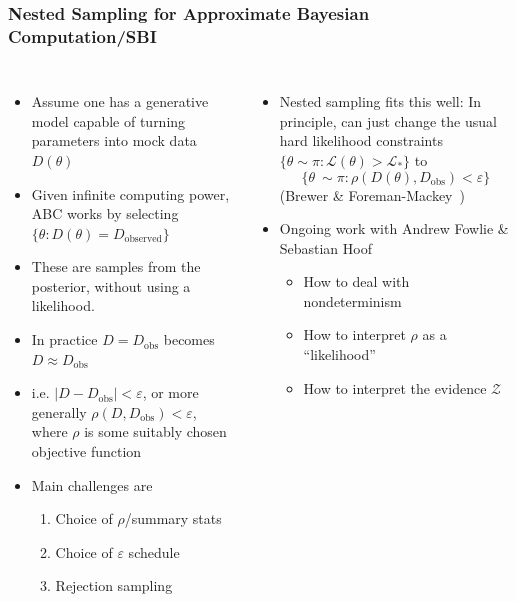 \documentclass[aspectratio=169]{beamer}
\begin{document}
\begin{frame}
    \frametitle{Nested Sampling for Approximate Bayesian Computation/SBI}
    \begin{columns}
        \begin{itemize}
            \item Assume one has a generative model capable of turning parameters into mock data $D(\theta)$
            \item Given infinite computing power, ABC works by selecting $\{\theta : D(\theta)=D_\mathrm{observed}\}$
            \item These are samples from the posterior, without using a likelihood.
            \item In practice $D=D_\mathrm{obs}$ becomes $D\approx D_\mathrm{obs}$
            \item i.e. $|D-D_\mathrm{obs}|<\varepsilon$, or more generally $\boxed{\rho(D,D_\mathrm{obs})<\varepsilon}$, where $\rho$ is some suitably chosen objective function
            \item Main challenges are 
                \begin{enumerate}
                    \item Choice of $\rho$/summary stats
                    \item Choice of $\varepsilon$ schedule
                    \item Rejection sampling
                \end{enumerate}
        \end{itemize}
        \begin{itemize}
            \item Nested sampling fits this well: In principle, can just change the usual hard likelihood constraints $\{\theta\sim\pi : \mathcal{L}(\theta)>\mathcal{L}_*\}$ to
                \[\{\theta~\sim\pi : \rho(D(\theta),D_\mathrm{obs})<\varepsilon\}\]
            (Brewer \& Foreman-Mackey~)
            \item Ongoing work with Andrew Fowlie \& Sebastian Hoof
                \begin{itemize}
                    \item How to deal with nondeterminism 
                    \item How to interpret $\rho$ as a ``likelihood''
                    \item How to interpret the evidence $\mathcal{Z}$
                \end{itemize}
        \end{itemize}
    \end{columns}
\end{frame}
\end{document}
